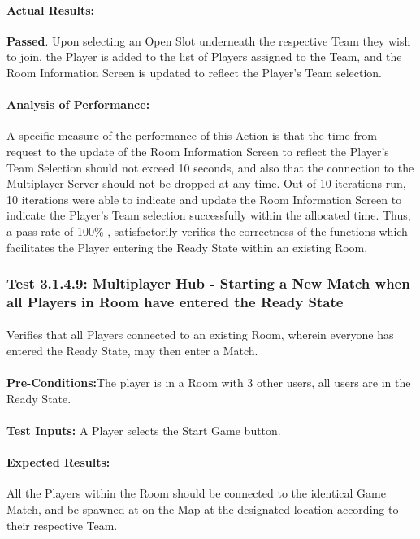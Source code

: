 \documentclass{article}
\begin{document}
    \paragraph{Actual Results:} \textbf{Passed}. Upon selecting an Open Slot underneath the respective Team they wish to join, the Player is added to the list of Players assigned to the Team, and the Room Information Screen is updated to reflect the Player's Team selection.
    \paragraph{Analysis of Performance:} A specific measure of the performance of this Action is that the time from request to the update of the Room Information Screen to reflect the Player's Team Selection should not exceed 10 seconds, and also that the connection to the Multiplayer Server should not be dropped at any time. Out of 10 iterations run, 10 iterations were able to indicate and update the Room Information Screen to indicate the Player's Team selection successfully within the allocated time.  Thus, a pass rate of 100\% , satisfactorily verifies the correctness of the functions which facilitates the Player entering the Ready State within an existing Room.
    
    \subsubsection{Test 3.1.4.9: Multiplayer Hub - Starting a New Match when all Players in Room have entered the Ready State}
    \paragraph{} Verifies that all Players connected to an existing Room, wherein everyone has entered the Ready State, may then enter a Match.
    \paragraph{}\textbf{Pre-Conditions:}The player is in a Room with 3 other users, all users are in the Ready State.
    \paragraph{}\textbf{Test Inputs:} A Player selects the Start Game button.
    \paragraph{Expected Results:} All the Players within the Room should be connected to the identical Game Match, and be spawned at on the Map at the designated location according to their respective Team.
\end{document}
